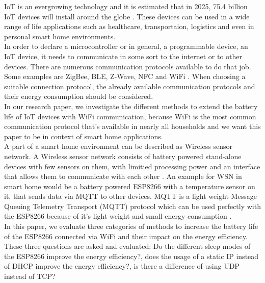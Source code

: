 IoT is an evergrowing technology and it is estimated that in 2025, 75.4 billion IoT devices will install around the globe \cite{lucero2016iot}. These devices can be used in a wide range of life applications such as healthcare, transportaion, logistics and even in personal smart home environments.\\  
In order to declare a microcontroller or in general, a programmable device, an IoT device, it needs to communicate in some sort to the internet or to other devices. There are numerous communication protocols available to do that job. Some examples are ZigBee, BLE, Z-Wave, NFC and WiFi \cite{8079928}. 
When choosing a suitable connection protocol, the already available communication protocols and their energy consumption should be considered.\\
In our research paper, we investigate the different methods to extend the battery life of IoT devices with WiFi communication, because WiFi is the most common communication protocol that's available in nearly all households and we want this paper to be in context of smart home applications.\\
A part of a smart home environment can be described as Wireless sensor network. A Wireless sensor network consists of battery powered stand-alone devices with few sensors on them, with limitied processing power and an interface that allows them to communicate with each other \cite{wsn}. 
An example for WSN in smart home would be a battery powered ESP8266 with a temperature sensor on it, that sends data via MQTT to other devices.
MQTT is a light weight Message Queuing Telemetry Transport (MQTT) protocol which can be used perfectly with the ESP8266 because of it's light weight and small energy consumption \cite{kodali_mqtt_2016}.\\
In this paper, we evaluate three categories of methods to increase the battery life of the ESP8266 connected via WiFi and their impact on the energy efficiency.
These three questions are asked and evaluated: Do the different sleep modes of the ESP8266 improve the energy efficiency?, does the usage of a static IP instead of DHCP improve the energy efficiency?, is there a difference of using UDP instead of TCP?
